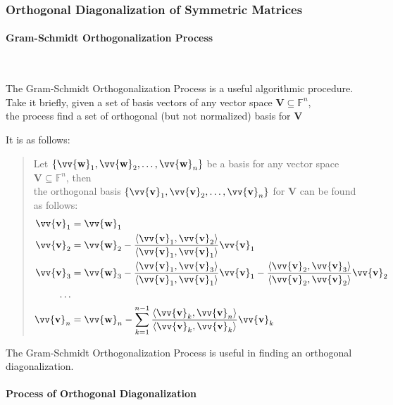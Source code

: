 \documentclass[11pt]{article}
\DeclareRobustCommand{\myvec}[1]{\vv{\mathbf{#1}}}
\newcommand{\mysubvecsp}[1]{\bm{{#1}}}
\begin{document}
    \newpage
    \subsubsection{Orthogonal Diagonalization of Symmetric Matrices}
    \paragraph{Gram-Schmidt Orthogonalization Process}~\vspace{1ex}

    The Gram-Schmidt Orthogonalization Process is a useful algorithmic procedure. \\
    Take it briefly, given a set of basis vectors of any vector space $\mysubvecsp{V} \subseteq \mathbb{F}^n$,\\
    \quad the process find a set of orthogonal (but not normalized) basis for $\mysubvecsp{V}$ \vspace{1ex}
    
    It is as follows:
    \begin{quote}
        Let $\{\myvec{w}_1, \myvec{w}_2, \dots, \myvec{w}_n\}$ be a basis for any vector space $\mysubvecsp{V} \subseteq \mathbb{F}^n$, then\\
        the orthogonal basis $\{\myvec{v}_1, \myvec{v}_2, \dots, \myvec{v}_n\}$ for $\mysubvecsp{V}$ can be found as follows:
        \begin{align*}
            \myvec{v}_1 &= \myvec{w}_1 \\
            \myvec{v}_2 &= \myvec{w}_2 - \frac{\langle \myvec{v}_1, \myvec{v}_2 \rangle}{\langle \myvec{v}_1, \myvec{v}_1 \rangle}\myvec{v}_1 \\
            \myvec{v}_3 &= \myvec{w}_3 - \frac{\langle \myvec{v}_1, \myvec{v}_3 \rangle}{\langle \myvec{v}_1, \myvec{v}_1 \rangle}\myvec{v}_1 - \frac{\langle \myvec{v}_2, \myvec{v}_3 \rangle}{\langle \myvec{v}_2, \myvec{v}_2 \rangle}\myvec{v}_2 \\
            \dots \\
            \myvec{v}_n &= \myvec{w}_n - \sum_{k = 1}^{n-1} \frac{\langle \myvec{v}_k, \myvec{v}_n \rangle}{\langle \myvec{v}_k, \myvec{v}_k \rangle}\myvec{v}_k \\
        \end{align*}
    \end{quote}
    The Gram-Schmidt Orthogonalization Process is useful in finding an orthogonal diagonalization.

    \paragraph{Process of Orthogonal Diagonalization}~\vspace{1ex}
\end{document}
